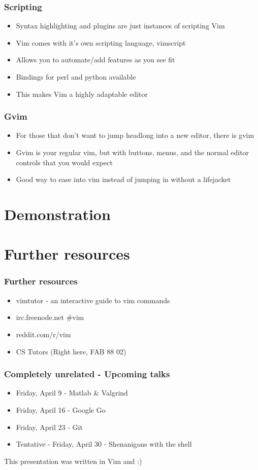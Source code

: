 \documentclass{beamer}
\begin{document}
\begin{frame}
    \frametitle{Scripting}
    \begin{itemize}
	\item Syntax highlighting and plugins are just instances of scripting Vim
	\item Vim comes with it's own scripting language, vimscript
	\item Allows you to automate/add features as you see fit
	\item Bindings for perl and python available
	\item This makes Vim a highly adaptable editor
    \end{itemize}
\end{frame}

\begin{frame}
    \frametitle{Gvim}
    \begin{itemize}
	\item For those that don't want to jump headlong into a new editor,
	    there is gvim
	\item Gvim is your regular vim, but with buttons, menus, and the normal
	    editor controls that you would expect
	\item Good way to ease into vim instead of jumping in without a 
	    lifejacket
    \end{itemize}
\end{frame}

\section{Demonstration}

\section{Further resources}

\begin{frame}
    \frametitle{Further resources}
    \begin{itemize}
	\item vimtutor - an interactive guide to vim commands
	\item irc.freenode.net \#vim
	\item reddit.com/r/vim
	\item CS Tutors (Right here, FAB 88 02)
    \end{itemize}
\end{frame}

\begin{frame}
    \frametitle{Completely unrelated - Upcoming talks}
    \begin{itemize}
	\item Friday, April 9 - Matlab \& Valgrind
	\item Friday, April 16 - Google Go
	\item Friday, April 23 - Git
	\item Tentative - Friday, April 30 - Shenanigans with the shell
    \end{itemize}
\end{frame}

\begin{frame}
    This presentation was written in Vim and \LaTeXe{} :)
\end{frame}
\end{document}
